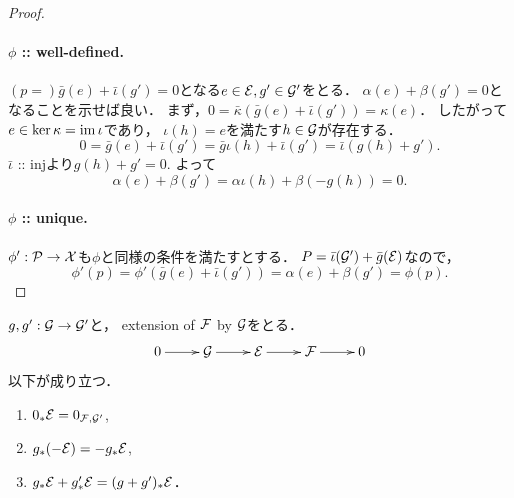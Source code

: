 \documentclass[a4paper]{jsarticle}
\begin{document}
\begin{proof}
        \paragraph{$\phi$ :: well-defined.}
        $(p=)\bar{g}(e)+\bar{\iota}(g')=0$となる$e \in \mathcal{E}, g'\in \mathcal{G}'$をとる．
        $\alpha(e)+\beta(g')=0$となることを示せば良い．
        まず，$0=\bar{\kappa}(\bar{g}(e)+\bar{\iota}(g'))=\kappa(e)$．
        したがって$e \in \ker \kappa=\operatorname{im} \iota$であり，
        $\iota(h)=e$を満たす$h \in \mathcal{G}$が存在する．
        \[ 0=\bar{g}(e)+\bar{\iota}(g')=\bar{g}\iota(h)+\bar{\iota}(g')=\bar{\iota}(g(h)+g'). \]
        $\bar{\iota}$ :: injより$g(h)+g'=0$.
        よって
        \[ \alpha(e)+\beta(g')=\alpha \iota(h)+\beta(-g(h))=0. \]

        \paragraph{$\phi$ :: unique.}
        $\phi':\mathcal{P} \to \mathcal{X}$も$\phi$と同様の条件を満たすとする．
        $P=\bar{\iota}(\mathcal{G}')+\bar{g}(\mathcal{E})$なので，
        \[ \phi'(p)=\phi'(\bar{g}(e)+\bar{\iota}(g'))=\alpha(e)+\beta(g')=\phi(p). \]
    \end{proof}
    \begin{Lemma} \label{lemma:peoperties_of_pushout_of_ext}
        $g, g': \mathcal{G} \to \mathcal{G}'$と，
        extension of $\mathcal{F}$ by $\mathcal{G}$をとる．
        \[\xymatrix{
            0 \ar[r]& \shG \ar[r]& \shE \ar[r]& \shF \ar[r]& 0
        }\]
        以下が成り立つ．
        \begin{enumerate}[label=(\alph*), leftmargin=*, labelindent=1cm]
            \item $0_*\mathcal{E}=0_{\mathcal{F}, \mathcal{G}'}$,
            \item $g_*(-\mathcal{E})=-g_*\mathcal{E}$,
            \item $g_*\mathcal{E}+g'_*\mathcal{E}=(g+g')_*\mathcal{E}$．
        \end{enumerate}
    \end{Lemma}
\end{document}
